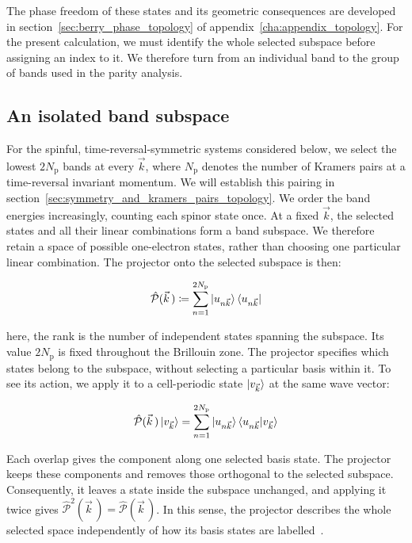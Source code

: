 The phase freedom of these states and its geometric consequences are developed in section~\ref{sec:berry_phase_topology} of appendix~\ref{cha:appendix_topology}.
For the present calculation, we must identify the whole selected subspace before assigning an index to it.
We therefore turn from an individual band to the group of bands used in the parity analysis.

\subsection{An isolated band subspace}
\label{subsec:isolated_band_subspace_topology}

For the spinful, time-reversal-symmetric systems considered below,
we select the lowest $2N_\mathrm{p}$ bands at every $\vec{k}$,
where $N_\mathrm{p}$ denotes the number of Kramers pairs at a time-reversal invariant momentum.
We will establish this pairing in section~\ref{sec:symmetry_and_kramers_pairs_topology}.
We order the band energies increasingly, counting each spinor state once.
At a fixed $\vec{k}$, the selected states and all their linear combinations form a band subspace.
We therefore retain a space of possible one-electron states, rather than choosing one particular linear combination.
The projector onto the selected subspace is then:

\begin{equation}
    \hat{\mathcal{P}}(\vec{k}\,)
    \coloneqq\sum_{n=1}^{2N_\mathrm{p}}
    \ket{u_{n\vec{k}}}\bra{u_{n\vec{k}}}
\label{band_subspace_projector_topology}
\end{equation}

here, the rank is the number of independent states spanning the subspace.
Its value $2N_\mathrm{p}$ is fixed throughout the Brillouin zone.
The projector specifies which states belong to the subspace,
without selecting a particular basis within it.
To see its action, we apply it to a cell-periodic state $\ket{v_{\vec{k}}}$ at the same wave vector:

\begin{equation}
    \hat{\mathcal{P}}(\vec{k}\,)\ket{v_{\vec{k}}}
    =\sum_{n=1}^{2N_\mathrm{p}}
    \ket{u_{n\vec{k}}}\braket{u_{n\vec{k}}|v_{\vec{k}}}
\label{band_projector_action_topology}
\end{equation}

Each overlap gives the component along one selected basis state.
The projector keeps these components and removes those orthogonal to the selected subspace.
Consequently, it leaves a state inside the subspace unchanged, and applying it twice gives
$\hat{\mathcal{P}}^2(\vec{k}\,)=\hat{\mathcal{P}}(\vec{k}\,)$.
In this sense, the projector describes the whole selected space independently of how its basis states are labelled~\cite{marzari2012maximally}.

